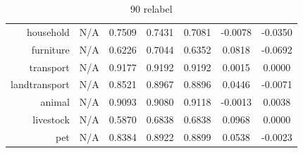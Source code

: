 \documentclass[11pt,a4paper]{article}
\begin{document}
\begin{table}[htbp]
\begin{tabular}{r|c|c|c|c|c|c}
household     & N/A    & 0.7509 & 0.7431 & 0.7081 & -0.0078 & -0.0350\\
furniture     & N/A    & 0.6226 & 0.7044 & 0.6352 & 0.0818 & -0.0692\\
transport     & N/A    & 0.9177 & 0.9192 & 0.9192 & 0.0015 & 0.0000\\
landtransport & N/A    & 0.8521 & 0.8967 & 0.8896 & 0.0446 & -0.0071\\
animal        & N/A    & 0.9093 & 0.9080 & 0.9118 & -0.0013 & 0.0038\\
livestock     & N/A    & 0.5870 & 0.6838 & 0.6838 & 0.0968 & 0.0000\\
pet           & N/A    & 0.8384 & 0.8922 & 0.8899 & 0.0538 & -0.0023
\end{tabular}
\caption{90 relabel}
\label{tab:svm90acc}
\end{table}
\end{document}
